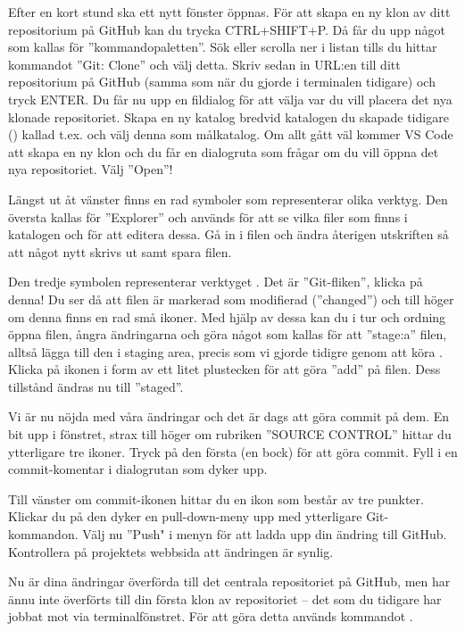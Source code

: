 \begin{Datorarbete}
	Efter en kort stund ska ett nytt fönster öppnas. För att skapa en ny klon av ditt repositorium på GitHub kan du trycka CTRL+SHIFT+P. Då får du upp något som kallas för ''kommandopaletten''. Sök eller scrolla ner i listan tills du hittar kommandot ''Git: Clone'' och välj detta. Skriv sedan in URL:en till ditt repositorium på GitHub (samma som när du gjorde  i terminalen tidigare) och tryck ENTER. Du får nu upp en fildialog för att välja var du vill placera det nya klonade repositoriet. Skapa en ny katalog bredvid katalogen du skapade tidigare () kallad t.ex.  och välj denna som målkatalog. Om allt gått väl kommer VS Code att skapa en ny klon och du får en dialogruta som frågar om du vill öppna det nya repositoriet. Välj ''Open''!

	\item Längst ut åt vänster finns en rad symboler som representerar olika verktyg. Den översta kallas för ''Explorer'' och används för att se vilka filer som finns i katalogen och för att editera dessa. Gå in i filen  och ändra återigen utskriften så att något nytt skrivs ut samt spara filen.

	Den tredje symbolen representerar verktyget . Det är ''Git-fliken'', klicka på denna! Du ser då att filen   är markerad som modifierad (''changed'') och till höger om denna finns en rad små ikoner. Med hjälp av dessa kan du i tur och ordning öppna filen, ångra ändringarna och göra något som kallas för att ''stage:a'' filen, alltså lägga till den i staging area, precis som vi gjorde tidigre genom att köra . Klicka på ikonen i form av ett litet plustecken för att göra ''add'' på filen. Dess tillstånd ändras nu till ''staged''.

	Vi är nu  nöjda med våra ändringar och det är dags att göra commit på dem. En bit upp i fönstret, strax till höger om rubriken ''SOURCE CONTROL'' hittar du ytterligare tre ikoner. Tryck på den första (en bock) för att göra commit. Fyll i en commit-komentar i dialogrutan som dyker upp.

	\item Till vänster om commit-ikonen hittar du en ikon som består av tre punkter. Klickar du på den dyker en pull-down-meny upp med ytterligare Git-kommandon. Välj nu ''Push" i menyn för att ladda upp din ändring till GitHub. Kontrollera på projektets webbsida att ändringen är synlig.

	\item Nu är dina ändringar överförda till det centrala repositoriet på GitHub, men har ännu inte överförts till din första klon av repositoriet -- det som du tidigare har jobbat mot via terminalfönstret. För att göra detta används kommandot .
	\\



\end{Datorarbete}
